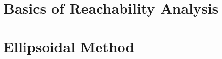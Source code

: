 \newcommand{\UX}{\underline{\XX}}
\newcommand{\OX}{\overline{\XX}}
\newcommand{\UXOL}{\underline{\XX}_{OL}}
\newcommand{\OXOL}{\overline{\XX}_{OL}}
\newcommand{\UXCL}{\underline{\XX}_{CL}}
\newcommand{\OXCL}{\overline{\XX}_{CL}}
\newcommand{\UY}{\underline{\YY}}
\newcommand{\OY}{\overline{\YY}}
\newcommand{\UYOL}{\underline{\YY}_{OL}}
\newcommand{\OYOL}{\overline{\YY}_{OL}}
\newcommand{\UYCL}{\underline{\YY}_{CL}}
\newcommand{\OYCL}{\overline{\YY}_{CL}}




\section{Basics of Reachability Analysis}\label{sec_reachproblem}


\section{Ellipsoidal Method}\label{sec_ellipsoidalmethod}



